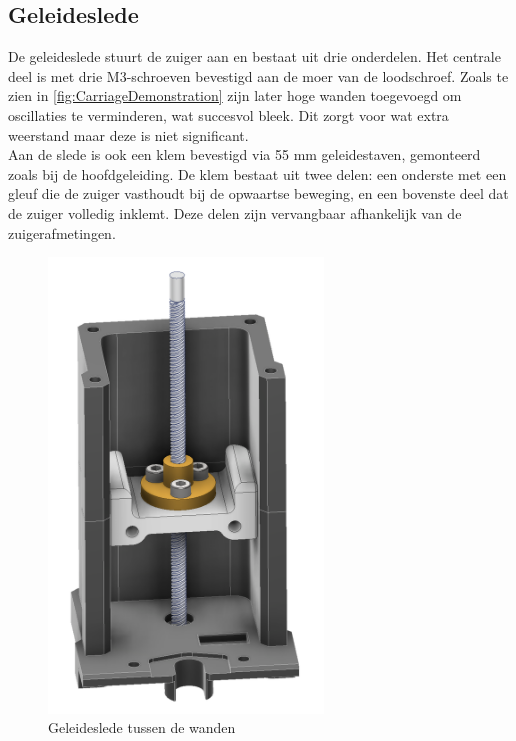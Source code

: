 \subsection{Geleideslede}
De geleideslede stuurt de zuiger aan en bestaat uit drie onderdelen. Het centrale deel is met drie M3-schroeven bevestigd aan de moer van de loodschroef. Zoals te zien in \autoref{fig:CarriageDemonstration} zijn later hoge wanden toegevoegd om oscillaties te verminderen, wat succesvol bleek. Dit zorgt voor wat extra weerstand maar deze is niet significant.
\\[12pt]Aan de slede is ook een klem bevestigd via 55 mm geleidestaven, gemonteerd zoals bij de hoofdgeleiding. De klem bestaat uit twee delen: een onderste met een gleuf die de zuiger vasthoudt bij de opwaartse beweging, en een bovenste deel dat de zuiger volledig inklemt. Deze delen zijn vervangbaar afhankelijk van de zuigerafmetingen.
\\[12pt]\begin{minipage}[t]{0.39\textwidth}
    \vspace{0pt}
    \begin{figure}[H]
        \centering
        \includegraphics[width=0.65\textwidth]{figures/CarriageDemonstration.png}
        \caption{Geleideslede tussen de wanden}\label{fig:CarriageDemonstration}
    \end{figure}
\end{minipage}
